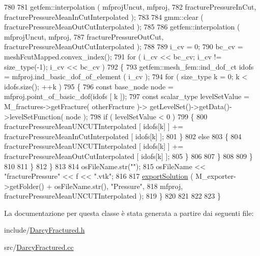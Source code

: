 \begin{DoxyCode}
780 
781                 getfem::interpolation ( mfprojUncut, mfproj,
782                                         fracturePressureInCut, fracturePressureMeanInCutInterpolated );
783 
784                 gmm::clear ( fracturePressureMeanOutCutInterpolated );
785 
786                 getfem::interpolation ( mfprojUncut, mfproj,
787                                         fracturePressureOutCut, fracturePressureMeanOutCutInterpolated );
788 
789                 i\_cv = 0;
790                 bc\_cv = meshFcutMapped.convex\_index();
791                 \textcolor{keywordflow}{for} ( i\_cv << bc\_cv; i\_cv != size\_type(-1); i\_cv << bc\_cv )
792                 \{
793                     getfem::mesh\_fem::ind\_dof\_ct idofs = mfproj.ind\_basic\_dof\_of\_element ( i\_cv );
794                     \textcolor{keywordflow}{for} ( size\_type k = 0; k < idofs.size(); ++k )
795                     \{
796                         \textcolor{keyword}{const} base\_node node = mfproj.point\_of\_basic\_dof(idofs [ k ]);
797                         \textcolor{keyword}{const} scalar\_type levelSetValue = M\_fractures->getFracture( otherFracture )->
      getLevelSet()->getData()->levelSetFunction( node );
798                         \textcolor{keywordflow}{if} ( levelSetValue < 0 )
799                         \{
800                             fracturePressureMeanUNCUTInterpolated [ idofs[k] ] += 
      fracturePressureMeanInCutInterpolated [ idofs[k] ];
801                         \}
802                         \textcolor{keywordflow}{else}
803                         \{
804                             fracturePressureMeanUNCUTInterpolated [ idofs[k] ] += 
      fracturePressureMeanOutCutInterpolated [ idofs[k] ];
805                         \}
806 
807                     \}
808 
809                 \}
810 
811             \}
812         \}
813 
814         osFileName.str(\textcolor{stringliteral}{""});
815         osFileName << \textcolor{stringliteral}{"fracturePressure"} << f << \textcolor{stringliteral}{".vtk"};
816 
817         \hyperlink{UsefulFunctions_8h_add7b8b88dc68d93addd88b9a4dc6e8bf}{exportSolution} ( M\_exporter->getFolder() + osFileName.str(), \textcolor{stringliteral}{"Pressure"},
818                      mfproj, fracturePressureMeanUNCUTInterpolated );
819     \}
820 
821    
822    
823 \}\end{DoxyCode}


La documentazione per questa classe è stata generata a partire dai seguenti file\-:\begin{DoxyCompactItemize}
\item 
include/\hyperlink{DarcyFractured_8h}{Darcy\-Fractured.\-h}\item 
src/\hyperlink{DarcyFractured_8cc}{Darcy\-Fractured.\-cc}\end{DoxyCompactItemize}
